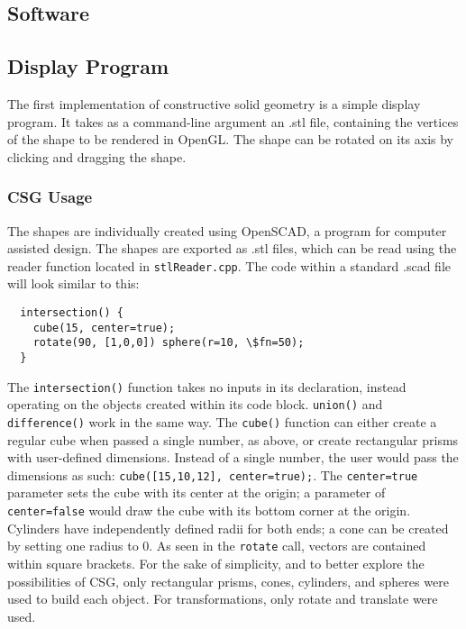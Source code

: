 \documentclass[12pt]{article}
\begin{document}
\begin{doublespace}
\section{Software}
\subsection{Display Program}
The first implementation of constructive solid geometry is a simple display program. It takes as a command-line argument an .stl file, containing the vertices of the shape to be rendered in OpenGL. The shape can be rotated on its axis by clicking and dragging the shape.
\subsubsection{CSG Usage}
The shapes are individually created using OpenSCAD, a program for computer assisted design. The shapes are exported as .stl files, which can be read using the reader function located in \texttt{stlReader.cpp}. The code within a standard .scad file will look similar to this:
\lstset{language=scad}
\begin{lstlisting}
  intersection() {
    cube(15, center=true);
    rotate(90, [1,0,0]) sphere(r=10, \$fn=50);
  }
\end{lstlisting}
The \texttt{intersection()} function takes no inputs in its declaration, instead operating on the objects created within its code block. \texttt{union()} and \texttt{difference()} work in the same way. The \texttt{cube()} function can either create a regular cube when passed a single number, as above, or create rectangular prisms with user-defined dimensions. Instead of a single number, the user would pass the dimensions as such: \texttt{cube([15,10,12], center=true);}. The \texttt{center=true} parameter sets the cube with its center at the origin; a parameter of \texttt{center=false} would draw the cube with its bottom corner at the origin. Cylinders have independently defined radii for both ends; a cone can be created by setting one radius to 0. As seen in the \texttt{rotate} call, vectors are contained within square brackets. For the sake of simplicity, and to better explore the possibilities of CSG, only rectangular prisms, cones, cylinders, and spheres were used to build each object. For transformations, only rotate and translate were used.\\


\end{doublespace}
\end{document}
